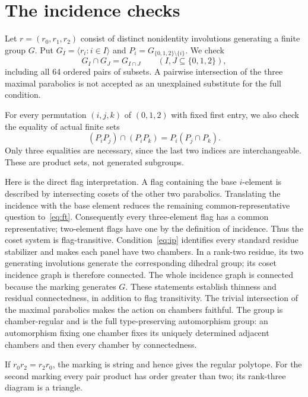 \documentclass[11pt]{article}
\begin{document}
\section{The incidence checks}
Let $r=(r_0,r_1,r_2)$ consist of distinct nonidentity involutions generating a finite group $G$. Put $G_I=\langle r_i:i\in I\rangle$ and $P_i=G_{\{0,1,2\}\setminus\{i\}}$. We check
\begin{equation}\label{eq:ip}
 G_I\cap G_J=G_{I\cap J}\qquad(I,J\subseteq\{0,1,2\}),
\end{equation}
including all 64 ordered pairs of subsets. A pairwise intersection of the three maximal parabolics is not accepted as an unexplained substitute for the full condition.

For every permutation $(i,j,k)$ of $(0,1,2)$ with fixed first entry, we also check the equality of actual finite sets
\begin{equation}\label{eq:ft}
 (P_iP_j)\cap(P_iP_k)=P_i(P_j\cap P_k).
\end{equation}
Only three equalities are necessary, since the last two indices are interchangeable. These are product sets, not generated subgroups.

Here is the direct flag interpretation. A flag containing the base $i$-element is described by intersecting cosets of the other two parabolics. Translating the incidence with the base element reduces the remaining common-representative question to~\eqref{eq:ft}. Consequently every three-element flag has a common representative; two-element flags have one by the definition of incidence. Thus the coset system is flag-transitive. Condition~\eqref{eq:ip} identifies every standard residue stabilizer and makes each panel have two chambers. In a rank-two residue, its two generating involutions generate the corresponding dihedral group; its coset incidence graph is therefore connected. The whole incidence graph is connected because the marking generates $G$. These statements establish thinness and residual connectedness, in addition to flag transitivity. The trivial intersection of the maximal parabolics makes the action on chambers faithful. The group is chamber-regular and is the full type-preserving automorphism group: an automorphism fixing one chamber fixes its uniquely determined adjacent chambers and then every chamber by connectedness.

If $r_0r_2=r_2r_0$, the marking is string and hence gives the regular polytope. For the second marking every pair product has order greater than two; its rank-three diagram is a triangle.
\end{document}
